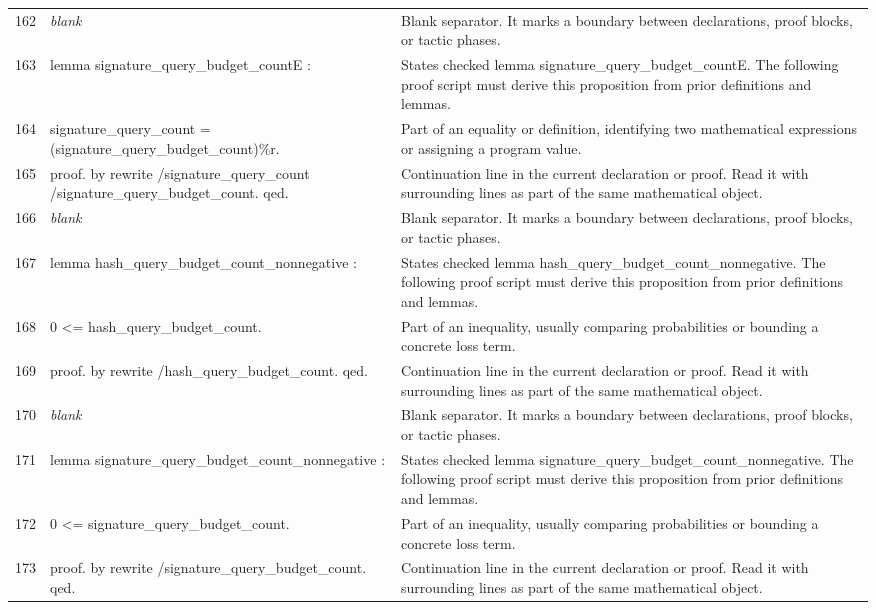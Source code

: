 \documentclass[10pt]{article}
\begin{document}
\begin{longtable}{r L{0.53\textwidth} L{0.37\textwidth}}
162 & {\ttfamily\scriptsize \emph{blank}} & Blank separator.  It marks a boundary between declarations, proof blocks, or tactic phases. \\
163 & {\ttfamily\scriptsize lemma signature\_query\_budget\_countE :} & States checked lemma signature\_query\_budget\_countE.  The following proof script must derive this proposition from prior definitions and lemmas. \\
164 & {\ttfamily\scriptsize   signature\_query\_count = (signature\_query\_budget\_count)\%r.} & Part of an equality or definition, identifying two mathematical expressions or assigning a program value. \\
165 & {\ttfamily\scriptsize proof. by rewrite /signature\_query\_count /signature\_query\_budget\_count. qed.} & Continuation line in the current declaration or proof.  Read it with surrounding lines as part of the same mathematical object. \\
166 & {\ttfamily\scriptsize \emph{blank}} & Blank separator.  It marks a boundary between declarations, proof blocks, or tactic phases. \\
167 & {\ttfamily\scriptsize lemma hash\_query\_budget\_count\_nonnegative :} & States checked lemma hash\_query\_budget\_count\_nonnegative.  The following proof script must derive this proposition from prior definitions and lemmas. \\
168 & {\ttfamily\scriptsize   0 <= hash\_query\_budget\_count.} & Part of an inequality, usually comparing probabilities or bounding a concrete loss term. \\
169 & {\ttfamily\scriptsize proof. by rewrite /hash\_query\_budget\_count. qed.} & Continuation line in the current declaration or proof.  Read it with surrounding lines as part of the same mathematical object. \\
170 & {\ttfamily\scriptsize \emph{blank}} & Blank separator.  It marks a boundary between declarations, proof blocks, or tactic phases. \\
171 & {\ttfamily\scriptsize lemma signature\_query\_budget\_count\_nonnegative :} & States checked lemma signature\_query\_budget\_count\_nonnegative.  The following proof script must derive this proposition from prior definitions and lemmas. \\
172 & {\ttfamily\scriptsize   0 <= signature\_query\_budget\_count.} & Part of an inequality, usually comparing probabilities or bounding a concrete loss term. \\
173 & {\ttfamily\scriptsize proof. by rewrite /signature\_query\_budget\_count. qed.} & Continuation line in the current declaration or proof.  Read it with surrounding lines as part of the same mathematical object. \\

\end{longtable}
\end{document}
